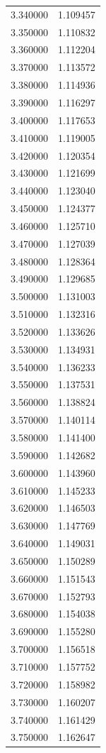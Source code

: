 \begin{tabular}{rr}
3.340000 & 1.109457 \\
3.350000 & 1.110832 \\
3.360000 & 1.112204 \\
3.370000 & 1.113572 \\
3.380000 & 1.114936 \\
3.390000 & 1.116297 \\
3.400000 & 1.117653 \\
3.410000 & 1.119005 \\
3.420000 & 1.120354 \\
3.430000 & 1.121699 \\
3.440000 & 1.123040 \\
3.450000 & 1.124377 \\
3.460000 & 1.125710 \\
3.470000 & 1.127039 \\
3.480000 & 1.128364 \\
3.490000 & 1.129685 \\
3.500000 & 1.131003 \\
3.510000 & 1.132316 \\
3.520000 & 1.133626 \\
3.530000 & 1.134931 \\
3.540000 & 1.136233 \\
3.550000 & 1.137531 \\
3.560000 & 1.138824 \\
3.570000 & 1.140114 \\
3.580000 & 1.141400 \\
3.590000 & 1.142682 \\
3.600000 & 1.143960 \\
3.610000 & 1.145233 \\
3.620000 & 1.146503 \\
3.630000 & 1.147769 \\
3.640000 & 1.149031 \\
3.650000 & 1.150289 \\
3.660000 & 1.151543 \\
3.670000 & 1.152793 \\
3.680000 & 1.154038 \\
3.690000 & 1.155280 \\
3.700000 & 1.156518 \\
3.710000 & 1.157752 \\
3.720000 & 1.158982 \\
3.730000 & 1.160207 \\
3.740000 & 1.161429 \\
3.750000 & 1.162647 \\

\end{tabular}
